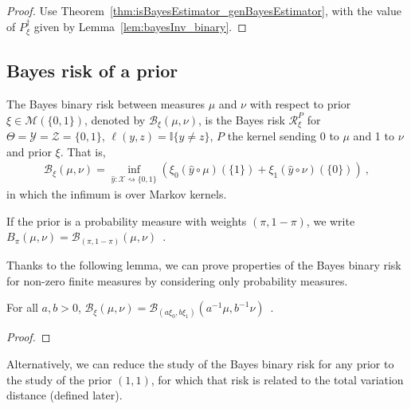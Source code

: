 \begin{proof}%
{}
Use Theorem~\ref{thm:isBayesEstimator_genBayesEstimator}, with the value of $P_\xi^\dagger$ given by Lemma~\ref{lem:bayesInv_binary}.
\end{proof}



\subsection{Bayes risk of a prior}

\begin{definition}
  \label{def:bayesBinaryRisk}
  \leanok
  The Bayes binary risk between measures $\mu$ and $\nu$ with respect to prior $\xi \in \mathcal M(\{0,1\})$, denoted by $\mathcal B_\xi(\mu, \nu)$, is the Bayes risk $\mathcal R^P_\xi$ for $\Theta = \mathcal Y = \mathcal Z = \{0,1\}$, $\ell(y,z) = \mathbb{I}\{y \ne z\}$, $P$ the kernel sending 0 to $\mu$ and 1 to $\nu$ and prior $\xi$.
  That is,
  \begin{align*}
  \mathcal B_\xi(\mu, \nu) = \inf_{\hat{y} : \mathcal X \rightsquigarrow \{0,1\}}\left(\xi_0 (\hat{y} \circ \mu)(\{1\}) + \xi_1 (\hat{y} \circ \nu)(\{0\})\right)
  \: ,
  \end{align*}
  in which the infimum is over Markov kernels.

  If the prior is a probability measure with weights $(\pi, 1 - \pi)$, we write $B_\pi(\mu, \nu) = \mathcal B_{(\pi, 1 - \pi)}(\mu, \nu)$~.
\end{definition}

Thanks to the following lemma, we can prove properties of the Bayes binary risk for non-zero finite measures by considering only probability measures.

\begin{lemma}
  \label{lem:bayesBinaryRisk_mul}
  \leanok
  For all $a, b > 0$, $\mathcal B_\xi(\mu, \nu) = \mathcal B_{(a \xi_0, b \xi_1)}(a^{-1} \mu, b^{-1} \nu)$~.
\end{lemma}

\begin{proof}\leanok
\uses{}

\end{proof}

Alternatively, we can reduce the study of the Bayes binary risk for any prior to the study of the prior $(1, 1)$, for which that risk is related to the total variation distance (defined later).


